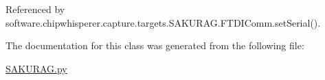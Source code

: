 Referenced by software.\+chipwhisperer.\+capture.\+targets.\+S\+A\+K\+U\+R\+A\+G.\+F\+T\+D\+I\+Comm.\+set\+Serial().



The documentation for this class was generated from the following file\+:\begin{DoxyCompactItemize}
\item 
\hyperlink{SAKURAG_8py}{S\+A\+K\+U\+R\+A\+G.\+py}\end{DoxyCompactItemize}
